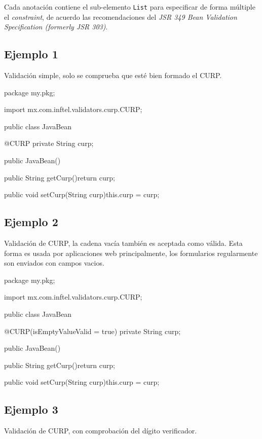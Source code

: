 \documentclass[12pt,letterpaper]{article}
\begin{document}
Cada anotación contiene el sub-elemento \texttt{List} para especificar de forma múltiple el \emph{constraint}, de
acuerdo las recomendaciones del \emph{JSR 349 Bean Validation Specification (formerly JSR 303)}.

\subsection{Ejemplo 1}

Validación simple, solo se comprueba que esté bien formado el CURP.

\begin{listing}{1}
package my.pkg;

import mx.com.inftel.validators.curp.CURP;

public class JavaBean{

    @CURP
    private String curp;

    public JavaBean(){}

    public String getCurp(){return curp;}

    public void setCurp(String curp){this.curp = curp;}
}
\end{listing}

\subsection{Ejemplo 2}

Validación de CURP, la cadena vacía también es aceptada como válida. Esta forma es usada por aplicaciones
web principalmente, los formularios regularmente son enviados con campos vacios.

\begin{listing}{1}
package my.pkg;

import mx.com.inftel.validators.curp.CURP;

public class JavaBean{

    @CURP(isEmptyValueValid = true)
    private String curp;

    public JavaBean(){}

    public String getCurp(){return curp;}

    public void setCurp(String curp){this.curp = curp;}
}
\end{listing}

\subsection{Ejemplo 3}

Validación de CURP, con comprobación del dígito verificador.
\end{document}
